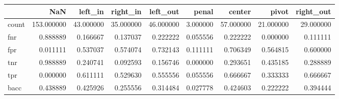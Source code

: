 \begin{tabular}{lrrrrrrrr}
\toprule
{} &         NaN &    left\_in &   right\_in &   left\_out &     penal &     center &      pivot &  right\_out \\
\midrule
count &  153.000000 &  43.000000 &  35.000000 &  46.000000 &  3.000000 &  57.000000 &  21.000000 &  29.000000 \\
fnr   &    0.888889 &   0.166667 &   0.137037 &   0.222222 &  0.055556 &   0.222222 &   0.000000 &   0.111111 \\
fpr   &    0.011111 &   0.537037 &   0.574074 &   0.732143 &  0.111111 &   0.706349 &   0.564815 &   0.600000 \\
tnr   &    0.988889 &   0.240741 &   0.092593 &   0.156746 &  0.000000 &   0.293651 &   0.435185 &   0.288889 \\
tpr   &    0.000000 &   0.611111 &   0.529630 &   0.555556 &  0.055556 &   0.666667 &   0.333333 &   0.666667 \\
bacc  &    0.438889 &   0.425926 &   0.255556 &   0.314484 &  0.027778 &   0.424603 &   0.222222 &   0.394444 \\
\bottomrule
\end{tabular}
